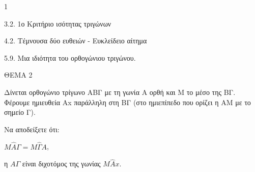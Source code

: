 \begin{ylh}{1}
    \item 3.2. 1ο Κριτήριο ισότητας τριγώνων
    \item 4.2. Τέμνουσα δύο ευθειών - Ευκλείδειο αίτημα
    \item 5.9. Μια ιδιότητα του ορθογώνιου τριγώνου.
\end{ylh}

ΘΕΜΑ 2

Δίνεται ορθογώνιο τρίγωνο ΑΒΓ με τη γωνία Α ορθή και Μ το μέσο της ΒΓ. Φέρουμε ημιευθεία Αx παράλληλη στη ΒΓ (στο ημιεπίπεδο που ορίζει η ΑΜ με το σημείο Γ).

Να αποδείξετε ότι:

\begin{alist}
\item $M\widehat{A}\Gamma = M\widehat{\Gamma}A$, 
\item η $A\Gamma$ είναι διχοτόμος της γωνίας $M\widehat{A}x$. 

\begin{center}
\end{center}
\end{alist}
